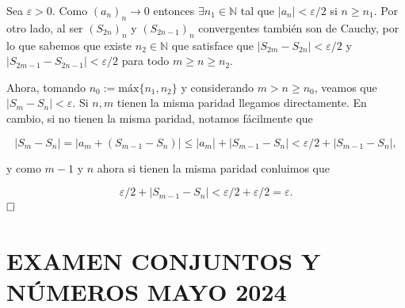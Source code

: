 \documentclass{article}
\begin{document}
Sea $\varepsilon > 0$. Como $(a_n)_n \longrightarrow 0$ entonces $\exists n_1 \in \mathbb{N}$ tal que $|a_n| < \varepsilon / 2$ si $n \geq n_1$. Por otro lado, al ser $(S_{2n})_n$ y $(S_{2n - 1})_n$ convergentes también son de Cauchy, por lo que sabemos que existe $n_2 \in \mathbb{N}$ que satisface que $|S_{2m} - S_{2n}| < \varepsilon / 2$ y $|S_{2m - 1} - S_{2n - 1}| < \varepsilon / 2$ para todo $m \geq n \geq n_2$.

Ahora, tomando $n_0 := \text{máx}\{n_1, n_2\}$ y considerando $m > n \geq n_0$, veamos que $|S_m - S_n| < \varepsilon$. Si $n, m$ tienen la misma paridad llegamos directamente. En cambio, si no tienen la misma paridad, notamos fácilmente que

\[|S_m - S_n| = |a_m + (S_{m - 1} - S_n)| \leq |a_m| + |S_{m - 1} - S_n| < \varepsilon / 2 + |S_{m - 1} - S_n|,\]

\noindent y como $m - 1$ y $n$ ahora si tienen la misma paridad conluimos que

\[\varepsilon / 2 + |S_{m - 1} - S_n| < \varepsilon / 2 + \varepsilon / 2 = \varepsilon.\] $\hfill\square$

\newpage

\section{EXAMEN CONJUNTOS Y NÚMEROS MAYO 2024}
\end{document}

